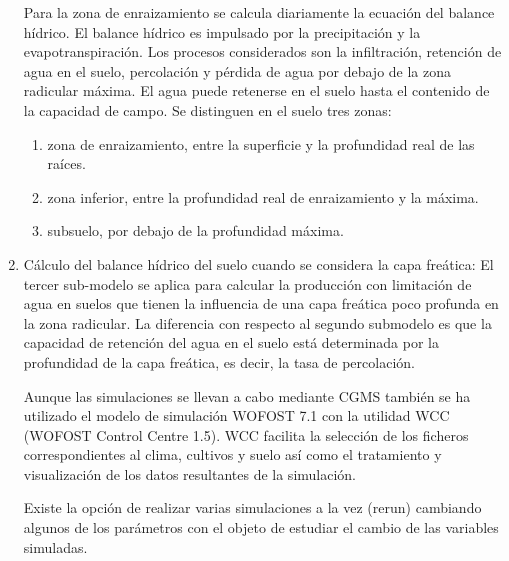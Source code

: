 \begin{enumerate}
	Para la zona de enraizamiento se calcula diariamente la ecuación del balance hídrico. El balance hídrico es impulsado por la precipitación y la evapotranspiración. Los procesos considerados son la infiltración, retención de agua en el suelo, percolación y pérdida de agua por debajo de la zona radicular máxima. El agua puede retenerse en el suelo hasta el contenido de la capacidad de campo. Se distinguen en el suelo tres zonas:
	\begin{enumerate}
		\item zona de enraizamiento, entre la superficie y la profundidad real de las raíces.
		\item zona inferior, entre la profundidad real de enraizamiento y la máxima.
		\item subsuelo, por debajo de la profundidad máxima.
	\end{enumerate}
	\item Cálculo del balance hídrico del suelo cuando se considera la capa freática: El tercer sub-modelo se aplica para calcular la producción con limitación de agua en suelos que tienen la influencia de una capa freática poco profunda en la zona radicular. La diferencia con respecto al segundo submodelo es que la capacidad de retención del agua en el suelo está determinada por la profundidad de la capa freática, es decir, la tasa de percolación.
	
	Aunque las simulaciones se llevan a cabo mediante CGMS también se ha utilizado el modelo de simulación WOFOST 7.1 con la utilidad WCC (WOFOST Control Centre 1.5). WCC facilita la selección de los ficheros correspondientes al clima, cultivos y suelo así como el tratamiento y visualización de los datos resultantes de la simulación. 
	
	Existe la opción de realizar varias simulaciones a la vez (rerun) cambiando algunos de los parámetros con el objeto de estudiar el cambio de las variables simuladas. 
	

\end{enumerate}
